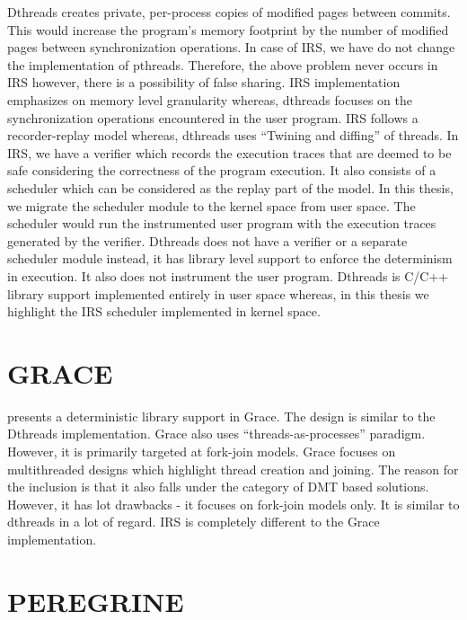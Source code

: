 Dthreads creates private, per-process copies of modified pages between commits. 
This would increase the program's memory footprint by the number of modified pages between synchronization operations. 
In case of IRS, we have do not change the implementation of pthreads. 
Therefore, the above problem never occurs in IRS however, there is a possibility of false sharing. 
IRS implementation emphasizes on memory level granularity whereas, dthreads focuses on the synchronization operations encountered in the user program. 
IRS follows a recorder-replay model whereas, dthreads uses ``Twining and diffing'' of threads. 
In IRS, we have a verifier which records the execution traces that are deemed to be safe considering the correctness of the program execution. 
It also consists of a scheduler which can be considered as the replay part of the model. 
In this thesis, we migrate the scheduler module to the kernel space from user space. 
The scheduler would run the instrumented user program with the execution traces generated by the verifier. 
Dthreads does not have a verifier or a separate scheduler module instead, it has library level support to enforce the determinism in execution. 
It also does not instrument the user program. 
Dthreads is C/C++ library support implemented entirely in user space whereas, in this thesis we highlight the IRS scheduler implemented in kernel space. 

\section{GRACE}

\citet{grace} presents a deterministic library support in Grace. 
The design is similar to the Dthreads implementation. 
Grace also uses ``threads-as-processes'' paradigm. 
However, it is primarily targeted at fork-join models. 
Grace focuses on multithreaded designs which highlight thread creation and joining. 
The reason for the inclusion is that it also falls under the category of DMT based solutions.
However, it has lot drawbacks - it focuses on fork-join models only. 
It is similar to dthreads in a lot of regard.  
IRS is completely different to the Grace implementation.

\section{PEREGRINE}

